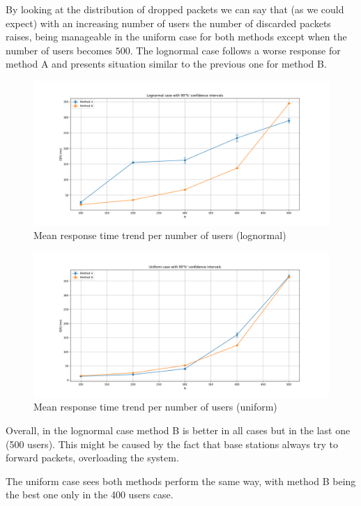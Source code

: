 \documentclass{report}
\begin{document}
By looking at the distribution of dropped packets we can say that (as we could expect) with an increasing number of users the number of discarded packets raises, being manageable in the uniform case for both methods except when the number of users becomes $500$.
The lognormal case follows a worse response for method A and presents situation similar to the previous one for method B. 

\begin{figure}[H]
    \centering
    \includegraphics[width=\textwidth]{img/Grafici/Lognormal Case.png}
    \caption{Mean response time trend per number of users (lognormal)}
\end{figure}
\begin{figure}[H]
    \centering
    \includegraphics[width=\textwidth]{img/Grafici/Uniform Case.png}
    \caption{Mean response time trend per number of users (uniform)}
\end{figure}

Overall, in the lognormal case method B is better in all cases but in the last one (500 users). This might be caused by the fact that base stations always try to forward packets, overloading the system.

The uniform case sees both methods perform the same way, with method B being the best one only in the 400 users case.
\end{document}

